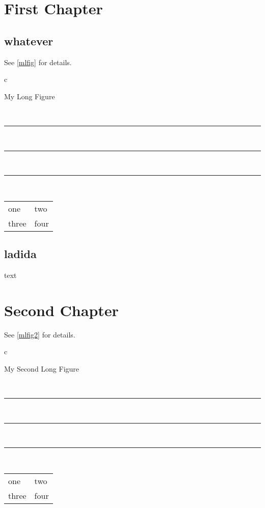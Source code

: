 \documentclass{book}
\begin{document}
\listofgiraffe
\chapter{First Chapter}
\section{whatever}

See \ref{mlfig} for details.

\begin{longfigure}{c}
\caption{My Long Figure}\label{mlfig}\\
\rule{3in}{1in}\\
\rule{3in}{1in}\\
\pagebreak
\rule{3in}{1in}\\

\begin{tabular}{ll}
one & two \\
three & four\\
\end{tabular}
\end{longfigure}
\section{ladida}
text
\chapter{Second Chapter}

See \ref{mlfig2} for details.
\begin{longfigure}{c}
\caption{My Second Long Figure}\label{mlfig2}\\
\rule{3in}{1in}\\
\rule{3in}{1in}\\
\rule{3in}{1in}\\
\begin{tabular}{ll}
one & two \\
three & four\\
\end{tabular}
\end{longfigure}
\end{document}
